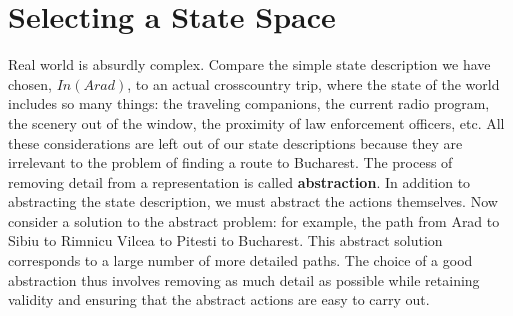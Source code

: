 \section{Selecting a State Space}
Real world is absurdly complex. Compare the simple state description we have chosen, $In(Arad)$, to an actual crosscountry trip, where the state of the world includes so many things: the traveling companions, the current radio program, the scenery out of the window, the proximity of law enforcement officers, etc. All these considerations are left out of our state descriptions because they are irrelevant to the problem of finding a route to Bucharest. The process of removing detail from a representation is called \textbf{abstraction}.
\newline\newline
In addition to abstracting the state description, we must abstract the actions themselves.\newline\newline
Now consider a solution to the abstract problem: for example, the path from Arad to Sibiu to Rimnicu Vilcea to Pitesti to Bucharest. This abstract solution corresponds to a large number of more detailed paths.
\newline\newline
The choice of a good abstraction thus involves removing as much detail as possible while retaining validity and ensuring that the abstract actions are easy to carry out.

